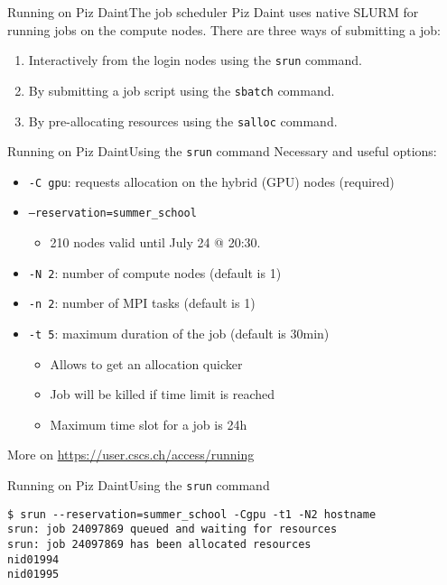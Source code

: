 \begin{frame}{Running on Piz Daint}{The job scheduler}
  Piz Daint uses native SLURM for running jobs on the compute nodes.
  There are three ways of submitting a job:
  \vspace\baselineskip
  \begin{enumerate}
  \item Interactively from the login nodes using the \texttt{srun} command.
  \item By submitting a job script using the \texttt{sbatch} command.
  \item By pre-allocating resources using the \texttt{salloc} command.
  \end{enumerate}
\end{frame}

\begin{frame}[fragile]{Running on Piz Daint}{Using the \texttt{srun} command}
  Necessary and useful options:
  \begin{itemize}
  \item \texttt{-C gpu}: requests allocation on the hybrid (GPU) nodes (required)
  \item \texttt{--reservation=summer\_school}
    \begin{itemize}
    \item 210 nodes valid until July 24 @ 20:30.
    \end{itemize}
  \item \texttt{-N 2}: number of compute nodes (default is 1)
  \item \texttt{-n 2}: number of MPI tasks (default is 1)
  \item \texttt{-t 5}: maximum duration of the job (default is 30min)
    \begin{itemize}
    \item Allows to get an allocation quicker
    \item Job will be killed if time limit is reached
    \item Maximum time slot for a job is 24h
    \end{itemize}
  \end{itemize}
  More on \url{https://user.cscs.ch/access/running}
\end{frame}

\begin{frame}[fragile]{Running on Piz Daint}{Using the \texttt{srun} command}
  \begin{lstlisting}[style=console,basicstyle=\ttfamily\scriptsize]
$ srun --reservation=summer_school -Cgpu -t1 -N2 hostname
srun: job 24097869 queued and waiting for resources
srun: job 24097869 has been allocated resources
nid01994
nid01995
  \end{lstlisting}
\end{frame}

